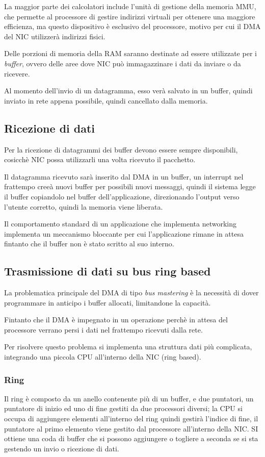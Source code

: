 La maggior parte dei calcolatori include l'unità di gestione della memoria MMU,
che permette al processore di gestire indirizzi virtuali per ottenere una
maggiore efficienza, ma questo dispositivo è esclusivo del processore, motivo
per cui il DMA del NIC utilizzerà indirizzi fisici.

Delle porzioni di memoria della RAM saranno destinate ad essere utilizzate per
i \emph{buffer}, ovvero delle aree dove NIC può immagazzinare i dati da inviare
o da ricevere.

Al momento dell'invio di un datagramma, esso verà salvato in un buffer, quindi
inviato in rete appena possibile, quindi cancellato dalla memoria.

\subsection{Ricezione di dati}
Per la ricezione di datagrammi dei buffer devono essere sempre disponibili,
cosicchè NIC possa utilizzarli una volta ricevuto il pacchetto.

Il datagramma ricevuto sarà inserito dal DMA in un buffer, un interrupt nel
frattempo creeà nuovi buffer per possibili nuovi messaggi, quindi il sistema
legge il buffer copiandolo nel buffer dell'applicazione, direzionando l'output
verso l'utente corretto, quindi la memoria viene liberata.

Il comportamento standard di un applicazione che implementa networking 
implementa un meccanismo bloccante per cui l'applicazione rimane in attesa
fintanto che il buffer non è stato scritto al suo interno.

\subsection{Trasmissione di dati su bus ring based}
La problematica principale del DMA di tipo \emph{bus mastering} è la
necessità di dover programmare in anticipo i buffer allocati, limitandone
la capacità.

Fintanto che il DMA è impegnato in un operazione perchè in attesa del
processore verrano persi i dati nel frattempo ricevuti dalla rete.

Per risolvere questo problema si implementa una struttura dati più complicata,
integrando una piccola CPU all'interno della NIC (ring based).

\subsubsection{Ring}
Il ring è composto da un anello contenente più di un buffer, e due puntatori,
un puntatore di inizio ed uno di fine gestiti da due processori diversi;
la CPU si occupa di aggiungere elementi all'interno del ring quindi gestirà
l'indice di fine, il puntatore al primo elemento viene gestito dal processore
all'interno della NIC.
SI ottiene una coda di buffer che si possono aggiungere o togliere a seconda
se si sta gestendo un invio o ricezione di dati.

